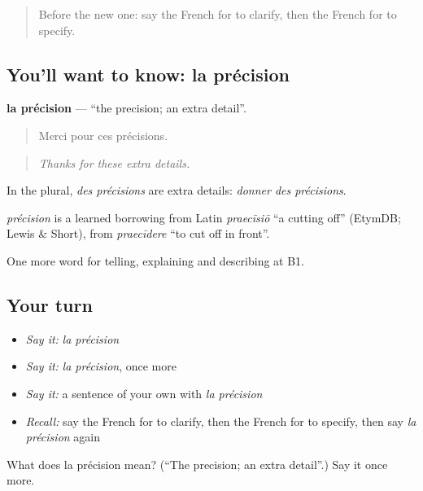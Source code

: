 \begin{quote}
Before the new one: say the French for to clarify, then the French for to specify.
\end{quote}

\subsection*{You'll want to know: la précision}
\textbf{la précision} — \textquotedblleft{}the precision; an extra detail\textquotedblright{}.

\begin{quote}
Merci pour ces précisions.
\end{quote}

\begin{quote}
\emph{Thanks for these extra details.}
\end{quote}

In the plural, \emph{des précisions} are extra details: \emph{donner des précisions}.

\begin{cousinweb}
\emph{précision} is a learned borrowing from Latin \emph{praecīsiō} \textquotedblleft{}a cutting off\textquotedblright{} (EtymDB; Lewis \& Short), from \emph{praecīdere} \textquotedblleft{}to cut off in front\textquotedblright{}.
\end{cousinweb}

\begin{grammarlens}[title={What you've built}]
One more word for telling, explaining and describing at B1.
\end{grammarlens}

\subsection*{Your turn}
\begin{itemize}
\raggedright
  \item \emph{Say it:} \emph{la précision}
  \item \emph{Say it:} \emph{la précision}, once more
  \item \emph{Say it:} a sentence of your own with \emph{la précision}
  \item \emph{Recall:} say the French for to clarify, then the French for to specify, then say \emph{la précision} again
\end{itemize}

\begin{tcolorbox}[breakable,colback=teal!4,colframe=teal!35!black,title={Before you move on}]
What does la précision mean? (\textquotedblleft{}The precision; an extra detail\textquotedblright{}.) Say it once more.
\end{tcolorbox}
